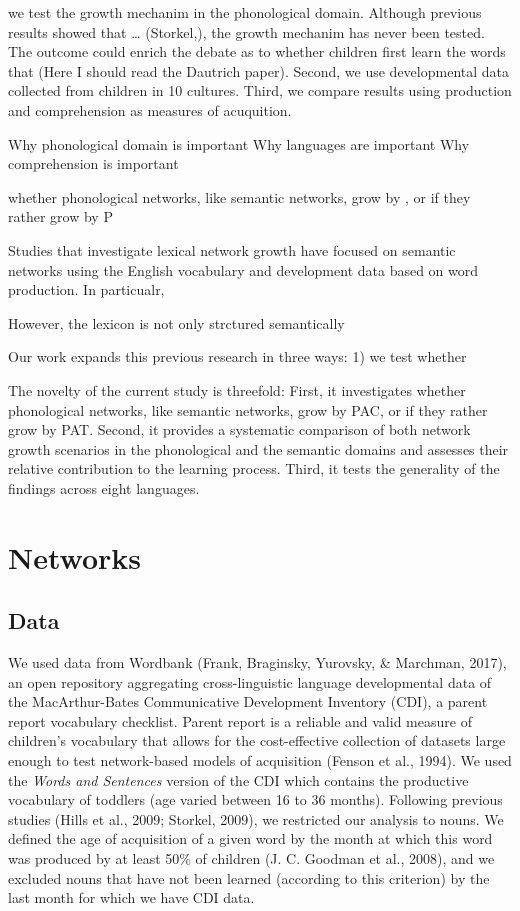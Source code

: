\documentclass[english,floatsintext,man]{apa6}
\theoremstyle{definition}
\theoremstyle{definition}
\theoremstyle{definition}
\theoremstyle{remark}
\begin{document}
we test the growth mechanim in the phonological domain. Although
previous results showed that \ldots{} (Storkel,), the growth mechanim
has never been tested. The outcome could enrich the debate as to whether
children first learn the words that (Here I should read the Dautrich
paper). Second, we use developmental data collected from children in 10
cultures. Third, we compare results using production and comprehension
as measures of acuquition.

Why phonological domain is important Why languages are important Why
comprehension is important

whether phonological networks, like semantic networks, grow by , or if
they rather grow by P

Studies that investigate lexical network growth have focused on semantic
networks using the English vocabulary and development data based on word
production. In particualr,

However, the lexicon is not only strctured semantically

Our work expands this previous research in three ways: 1) we test
whether

The novelty of the current study is threefold: First, it investigates
whether phonological networks, like semantic networks, grow by PAC, or
if they rather grow by PAT. Second, it provides a systematic comparison
of both network growth scenarios in the phonological and the semantic
domains and assesses their relative contribution to the learning
process. Third, it tests the generality of the findings across eight
languages.

\section{Networks}\label{networks}

\subsection{Data}\label{data}

We used data from Wordbank (Frank, Braginsky, Yurovsky, \& Marchman,
2017), an open repository aggregating cross-linguistic language
developmental data of the MacArthur-Bates Communicative Development
Inventory (CDI), a parent report vocabulary checklist. Parent report is
a reliable and valid measure of children's vocabulary that allows for
the cost-effective collection of datasets large enough to test
network-based models of acquisition (Fenson et al., 1994). We used the
\emph{Words and Sentences} version of the CDI which contains the
productive vocabulary of toddlers (age varied between 16 to 36 months).
Following previous studies (Hills et al., 2009; Storkel, 2009), we
restricted our analysis to nouns. We defined the age of acquisition of a
given word by the month at which this word was produced by at least 50\%
of children (J. C. Goodman et al., 2008), and we excluded nouns that
have not been learned (according to this criterion) by the last month
for which we have CDI data.
\end{document}

